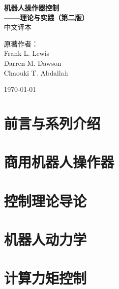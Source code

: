 \documentclass[UTF8,a4paper,12pt]{ctexbook}
\theoremstyle{definition}
\begin{document}
\begin{titlepage}
\begin{center}
\vspace*{3cm}

{\Huge\bfseries 机器人操作器控制}\\[1.5cm]
{\Large\bfseries ——理论与实践（第二版）}\\[2cm]
{\large 中文译本}\\[3cm]

\vfill

{\large 原著作者：}\\[0.5cm]
{\large Frank L. Lewis}\\
{\large Darren M. Dawson}\\
{\large Chaouki T. Abdallah}\\[2cm]

\vfill

{\large \today}

\end{center}
\end{titlepage}

\frontmatter

\chapter*{前言与系列介绍}


\tableofcontents
\newpage

\mainmatter

\chapter{商用机器人操作器}


\chapter{控制理论导论}


\chapter{机器人动力学}


\chapter{计算力矩控制}

\end{document}
